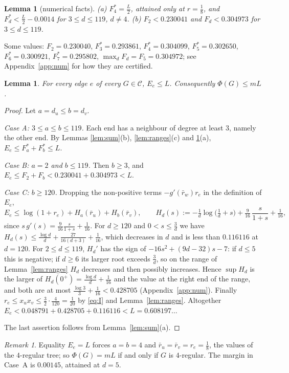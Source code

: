\documentclass[11pt]{amsart}
\theoremstyle{plain}
\newtheorem{lemma}[theorem]{Lemma}
\theoremstyle{remark}
\newtheorem{remark}[theorem]{Remark}
\newcommand{\cC}{\mathcal{C}}
\newcommand{\rb}{\bar r}
\begin{document}
\begin{lemma}[numerical facts]\label{lem:num}
\textup{(a)} $F^*_4=\frac L2$, attained only at $r=\frac18$, and $F^*_d<\frac L2-0.0014$ for $3\le d\le119$, $d\ne4$.
\textup{(b)} $F_2<0.230041$ and $F_d<0.304973$ for $3\le d\le119$.
\end{lemma}
\noindent Some values: $F_2=0.230040$, $F^*_3=0.293861$, $F^*_4=0.304099$, $F^*_5=0.302650$, $F^*_6=0.300921$,
$F^*_7=0.295802$, $\max_dF_d=F_5=0.304972$; see Appendix~\ref{app:num} for how they are certified.

\begin{lemma}\label{lem:edge}
For every edge $e$ of every $G\in\cC$, $E_e\le L$. Consequently $\Phi(G)\le mL$.
\end{lemma}
\begin{proof}
Let $a=d_u\le b=d_v$.

\emph{Case A: $3\le a\le b\le119$.} Each end has a neighbour of degree at least $3$, namely the other end. By
Lemmas \ref{lem:sum}(b), \ref{lem:ranges}(c) and \ref{lem:num}(a), $E_e\le F^*_a+F^*_b\le L$.

\emph{Case B: $a=2$ and $b\le119$.} Then $b\ge3$, and $E_e\le F_2+F_b<0.230041+0.304973<L$.

\emph{Case C: $b\ge120$.} Dropping the non-positive terms $-g'(\rb_w)r_e$ in the definition of $E_e$,
\[
 E_e\le\log(1+r_e)+H_a(\rb_u)+H_b(\rb_v),\qquad H_d(s):=-\tfrac1d\log\bigl(\tfrac1d+s\bigr)+\tfrac9{16}\,\frac{s}{1+s}+\tfrac1{16},
\]
since $s\,g'(s)=\frac9{16}\frac s{1+s}+\frac1{16}$. For $d\ge120$ and $0<s\le\frac3d$ we have
$H_d(s)\le\frac{\log d}{d}+\frac{27}{16(d+3)}+\frac1{16}$, which decreases in $d$ and is less than $0.116116$ at $d=120$. For $2\le d\le119$, $H_d'$ has the sign of
$-16s^2+(9d-32)s-7$: if $d\le5$ this is negative; if $d\ge6$ its larger root exceeds $\frac3d$, so on the range of
Lemma~\ref{lem:ranges} $H_d$ decreases and then possibly increases. Hence $\sup H_d$ is the larger of
$H_d(0^+)=\frac{\log d}d+\frac1{16}$ and the value at the right end of the range, and both are at most
$\frac{\log3}{3}+\frac1{16}<0.428705$ (Appendix~\ref{app:num}). Finally $r_e\le x_ux_v\le\frac32\cdot\frac4{120}=\frac1{20}$
by \eqref{eq:I} and Lemma~\ref{lem:ranges}. Altogether $E_e<0.048791+0.428705+0.116116<L=0.608197\ldots$

The last assertion follows from Lemma~\ref{lem:sum}(a).
\end{proof}

\begin{remark}\label{rem:eq}
Equality $E_e=L$ forces $a=b=4$ and $\rb_u=\rb_v=r_e=\frac18$, the values of the $4$-regular tree; so
$\Phi(G)=mL$ if and only if $G$ is $4$-regular. The margin in Case~A is $0.00145$, attained at $d=5$.
\end{remark}
\end{document}
